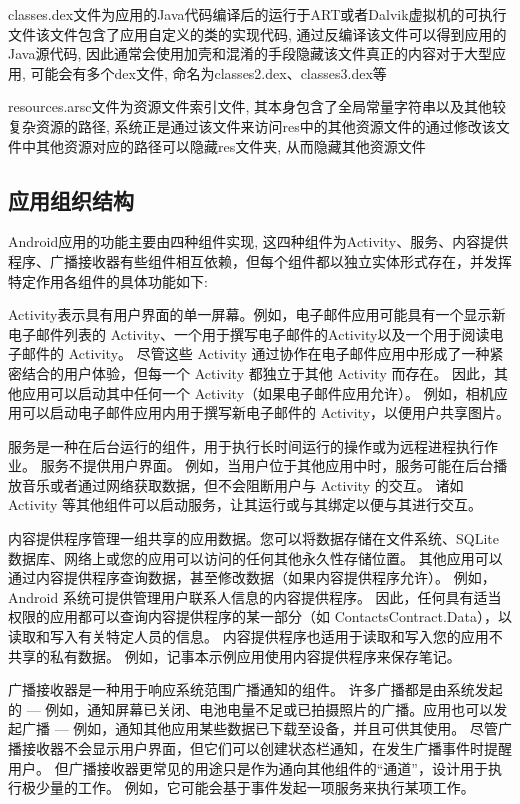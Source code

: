 classes.dex文件为应用的Java代码编译后的运行于ART或者Dalvik虚拟机的可执行文件\juhao 该文件包含了应用自定义的类的实现代码, 通过反编译该文件可以得到应用的Java源代码, 因此通常会使用加壳和混淆的手段隐藏该文件真正的内容\juhao 对于大型应用, 可能会有多个dex文件, 命名为classes2.dex、classes3.dex等\juhao

resources.arsc文件为资源文件索引文件, 其本身包含了全局常量字符串以及其他较复杂资源的路径, 系统正是通过该文件来访问res中的其他资源文件的\juhao 通过修改该文件中其他资源对应的路径可以隐藏res文件夹, 从而隐藏其他资源文件\juhao

\subsection{应用组织结构}
Android应用的功能主要由四种组件实现, 这四种组件为Activity、服务、内容提供程序、广播接收器\juhao 有些组件相互依赖，但每个组件都以独立实体形式存在，并发挥特定作用\juhao 各组件的具体功能如下:

Activity表示具有用户界面的单一屏幕。例如，电子邮件应用可能具有一个显示新电子邮件列表的 Activity、一个用于撰写电子邮件的Activity以及一个用于阅读电子邮件的 Activity。 尽管这些 Activity 通过协作在电子邮件应用中形成了一种紧密结合的用户体验，但每一个 Activity 都独立于其他 Activity 而存在。 因此，其他应用可以启动其中任何一个 Activity（如果电子邮件应用允许）。 例如，相机应用可以启动电子邮件应用内用于撰写新电子邮件的 Activity，以便用户共享图片。

服务是一种在后台运行的组件，用于执行长时间运行的操作或为远程进程执行作业。 服务不提供用户界面。 例如，当用户位于其他应用中时，服务可能在后台播放音乐或者通过网络获取数据，但不会阻断用户与 Activity 的交互。 诸如 Activity 等其他组件可以启动服务，让其运行或与其绑定以便与其进行交互。

内容提供程序管理一组共享的应用数据。您可以将数据存储在文件系统、SQLite 数据库、网络上或您的应用可以访问的任何其他永久性存储位置。 其他应用可以通过内容提供程序查询数据，甚至修改数据（如果内容提供程序允许）。 例如，Android 系统可提供管理用户联系人信息的内容提供程序。 因此，任何具有适当权限的应用都可以查询内容提供程序的某一部分（如 ContactsContract.Data），以读取和写入有关特定人员的信息。
内容提供程序也适用于读取和写入您的应用不共享的私有数据。 例如，记事本示例应用使用内容提供程序来保存笔记。

广播接收器是一种用于响应系统范围广播通知的组件。 许多广播都是由系统发起的 — 例如，通知屏幕已关闭、电池电量不足或已拍摄照片的广播。应用也可以发起广播 — 例如，通知其他应用某些数据已下载至设备，并且可供其使用。 尽管广播接收器不会显示用户界面，但它们可以创建状态栏通知，在发生广播事件时提醒用户。 但广播接收器更常见的用途只是作为通向其他组件的“通道”，设计用于执行极少量的工作。 例如，它可能会基于事件发起一项服务来执行某项工作。
